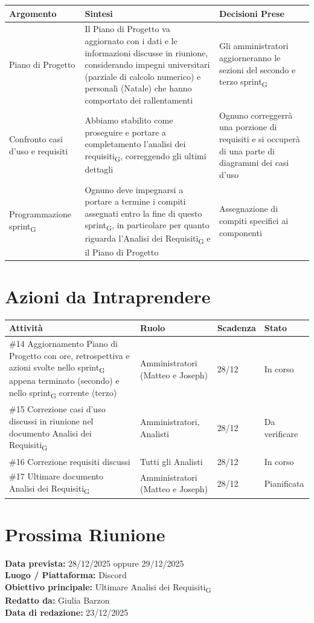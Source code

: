\documentclass[a4paper,12pt]{article}
\newcommand{\gls}[1]{#1\textsubscript{G}}
\begin{document}
\begin{longtable}{|p{}|p{}|p{}|}
\hline
\textbf{Argomento} & \textbf{Sintesi} & \textbf{Decisioni Prese} \\ \hline
Piano di Progetto & Il Piano di Progetto va aggiornato con i dati e le informazioni discusse in riunione, considerando impegni universitari (parziale di calcolo numerico) e personali (Natale) che hanno comportato dei rallentamenti & Gli amministratori aggiorneranno le sezioni del secondo e terzo \gls{sprint} \\ \hline

Confronto casi d'uso e requisiti & Abbiamo stabilito come proseguire e portare a completamento l'\gls{analisi dei requisiti}, correggendo gli ultimi dettagli & Ognuno correggerrà una porzione di requisiti e si occuperà di una parte di diagrammi dei casi d'uso \\ \hline

Programmazione \gls{sprint} & Ognuno deve impegnarsi a portare a termine i compiti assegnati entro la fine di questo \gls{sprint}, in particolare per quanto riguarda l'\gls{Analisi dei Requisiti} e il Piano di Progetto & Assegnazione di compiti specifici ai componenti \\ \hline

\end{longtable}

\section*{ Azioni da Intraprendere}

\begin{longtable}{|p{}|p{}|p{}|p{}|}
\hline
\textbf{Attività} & \textbf{Ruolo} & \textbf{Scadenza} & \textbf{Stato} \\ \hline
\#14 Aggiornamento Piano di Progetto con ore, retrospettiva e azioni svolte nello \gls{sprint} appena terminato (secondo) e nello \gls{sprint} corrente (terzo) & Amministratori (Matteo e Joseph) & 28/12 & In corso  \\ \hline
\#15 Correzione casi d'uso discussi in riunione nel documento \gls{Analisi dei Requisiti} & Amministratori, Analisti & 28/12 & Da verificare \\ \hline
\#16 Correzione requisiti discussi & Tutti gli Analisti & 28/12 & In corso \\ \hline
\#17 Ultimare documento \gls{Analisi dei Requisiti} & Amministratori (Matteo e Joseph) & 28/12 & Pianificata \\ \hline

\end{longtable}


\section*{ Prossima Riunione}
\textbf{Data prevista:} 28/12/2025 oppure 29/12/2025 \\
\textbf{Luogo / Piattaforma:} Discord \\
\textbf{Obiettivo principale:} Ultimare \gls{Analisi dei Requisiti} \\


\textbf{Redatto da:} Giulia Barzon \\
\textbf{Data di redazione:} 23/12/2025
\end{document}
